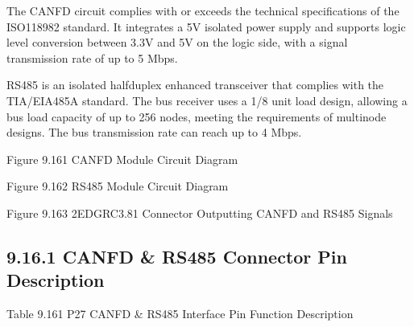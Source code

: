 \documentclass[letterpaper,10pt,openany,english]{sphinxmanual}
\begin{document}
\sphinxAtStartPar
The CANFD circuit complies with or exceeds the technical specifications of the ISO11898\sphinxhyphen{}2 standard. It integrates a 5V isolated power supply and supports logic level conversion between 3.3V and 5V on the logic side, with a signal transmission rate of up to 5 Mbps.

\sphinxAtStartPar
RS485 is an isolated half\sphinxhyphen{}duplex enhanced transceiver that complies with the TIA/EIA\sphinxhyphen{}485A standard. The bus receiver uses a 1/8 unit load design, allowing a bus load capacity of up to 256 nodes, meeting the requirements of multi\sphinxhyphen{}node designs. The bus transmission rate can reach up to 4 Mbps.

\sphinxAtStartPar
{}

\sphinxAtStartPar
Figure 9.16\sphinxhyphen{}1 CANFD Module Circuit Diagram

\sphinxAtStartPar
{}

\sphinxAtStartPar
Figure 9.16\sphinxhyphen{}2 RS485 Module Circuit Diagram

\sphinxAtStartPar
{}

\sphinxAtStartPar
Figure 9.16\sphinxhyphen{}3 2EDGRC\sphinxhyphen{}3.81 Connector Outputting CANFD and RS485 Signals


\subsection{9.16.1 CANFD \& RS485 Connector Pin Description}
\label{\detokenize{hardware:canfd-rs485-connector-pin-description}}
\sphinxAtStartPar
Table 9.16\sphinxhyphen{}1 P27 CANFD \& RS485 Interface Pin Function Description
\end{document}
